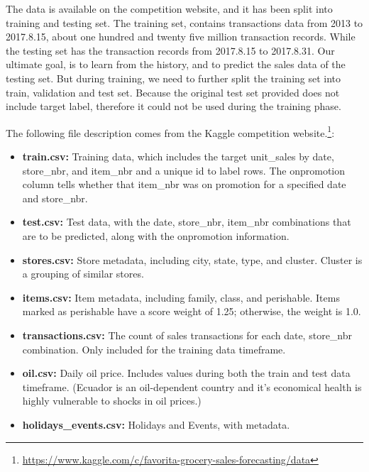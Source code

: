 \documentclass{article}
\begin{document}
\newcommand{\urlfile}{https://www.kaggle.com/c/favorita-grocery-sales-forecasting/data}

The data is available on the competition website, and it has been split into training and testing set. The training set, contains transactions data from 2013 to 2017.8.15, about one hundred and twenty five million transaction records. While the testing set has the transaction records from 2017.8.15 to 2017.8.31. Our ultimate goal, is to learn from the history, and to predict the sales data of the testing set. But during training, we need to further split the training set into train, validation and test set. Because the original test set provided does not include target label, therefore it could not be used during the training phase. 
\newline

The following file description comes from the Kaggle competition website.\footnote{\url{\urlfile}}:

\begin{itemize}

    \item \textbf{train.csv:} Training data, which includes the target unit\_sales by date, store\_nbr, and item\_nbr and a unique id to label rows. The onpromotion column tells whether that item\_nbr was on promotion for a specified date and store\_nbr. 

    \item \textbf{test.csv:} Test data, with the date, store\_nbr, item\_nbr combinations that are to be predicted, along with the onpromotion information.

    \item \textbf{stores.csv:} Store metadata, including city, state, type, and cluster. Cluster is a grouping of similar stores.

    \item \textbf{items.csv:} Item metadata, including family, class, and perishable. Items marked as perishable have a score weight of 1.25; otherwise, the weight is 1.0.

    \item \textbf{transactions.csv:} The count of sales transactions for each date, store\_nbr combination. Only included for the training data timeframe.

    \item \textbf{oil.csv:} Daily oil price. Includes values during both the train and test data timeframe. (Ecuador is an oil-dependent country and it's economical health is highly vulnerable to shocks in oil prices.)
    
    \item \textbf{holidays\_events.csv:} Holidays and Events, with metadata.  

\end{itemize}
\end{document}
